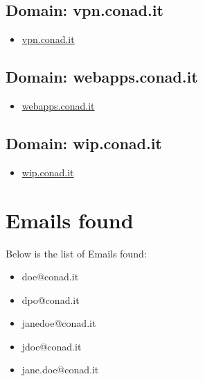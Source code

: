 \documentclass{article}
\begin{document}
    \subsection{Domain: vpn.conad.it}
    \begin{itemize}
        
            
            \item \href{ http://sslvpn.conad.it}{ vpn.conad.it }
            
        
    \end{itemize}

    \subsection{Domain: webapps.conad.it}
    \begin{itemize}
        
            
            \item \href{ http://webapps.conad.it}{ webapps.conad.it }
            
        
    \end{itemize}

    \subsection{Domain: wip.conad.it}
    \begin{itemize}
        
            
            \item \href{ http://wip.conad.it/}{ wip.conad.it }
            
        
    \end{itemize}



\clearpage

\section{Emails found}

Below is the list of Emails found:

\begin{itemize}
    
        
            \item doe@conad.it
        
            \item dpo@conad.it
        
            \item janedoe@conad.it
        
            \item jdoe@conad.it
        
            \item jane.doe@conad.it
        
    
\end{itemize}
\end{document}
